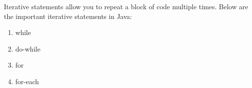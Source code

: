 \setlength{\columnsep}{3pt}
\begin{flushleft}
	
	Iterative statements allow you to repeat a block of code multiple times. 
	\newline
	Below are the important iterative statements in Java:
	\begin{enumerate}
		\item while
		\item do-while
		\item for
		\item for-each
	\end{enumerate}
	
	
\end{flushleft}



